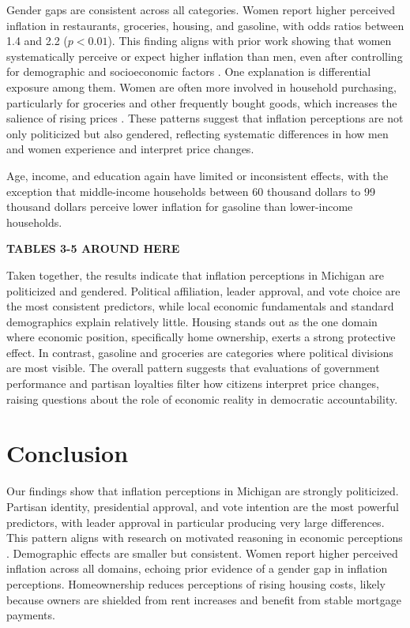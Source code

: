 \documentclass[]{interact}
\theoremstyle{plain}%
\theoremstyle{definition}
\theoremstyle{remark}
\begin{document}
Gender gaps are consistent across all categories. Women report higher perceived inflation in restaurants, groceries, housing, and gasoline, with odds ratios between 1.4 and 2.2 ($p<0.01$). This finding aligns with prior work showing that women systematically perceive or expect higher inflation than men, even after controlling for demographic and socioeconomic factors \citep{corduasGenderDifferencesPerception2022, chalwadiGenderDifferencesInflation2023, reicheThatsWhatShe2023,corduasGenderDifferencesPerception2022}. One explanation is differential exposure among them. Women are often more involved in household purchasing, particularly for groceries and other frequently bought goods, which increases the salience of rising prices \citep{corduasGenderDifferencesPerception2022,weberSurveysShowHousehold2023}. These patterns suggest that inflation perceptions are not only politicized but also gendered, reflecting systematic differences in how men and women experience and interpret price changes. 

Age, income, and education again have limited or inconsistent effects, with the exception that middle-income households between 60 thousand dollars to 99 thousand dollars perceive lower inflation for gasoline than lower-income households. 

\begin{center}
\textbf{TABLES 3-5 AROUND HERE}
\end{center}

Taken together, the results indicate that inflation perceptions in Michigan are politicized and gendered. Political affiliation, leader approval, and vote choice are the most consistent predictors, while local economic fundamentals and standard demographics explain relatively little. Housing stands out as the one domain where economic position, specifically home ownership, exerts a strong protective effect. In contrast, gasoline and groceries are categories where political divisions are most visible. The overall pattern suggests that evaluations of government performance and partisan loyalties filter how citizens interpret price changes, raising questions about the role of economic reality in democratic accountability.  

\section*{Conclusion}

Our findings show that inflation perceptions in Michigan are strongly politicized. Partisan identity, presidential approval, and vote intention are the most powerful predictors, with leader approval in particular producing very large differences. This pattern aligns with research on motivated reasoning in economic perceptions \citep{dickerson_conditional_2017,bisgaard_reconsidering_2016,farhartInflationExpectationsPolitical2026,kavetsosNotBadThought2025}. Demographic effects are smaller but consistent. Women report higher perceived inflation across all domains, echoing prior evidence of a gender gap in inflation perceptions. Homeownership reduces perceptions of rising housing costs, likely because owners are shielded from rent increases and benefit from stable mortgage payments.
\end{document}
